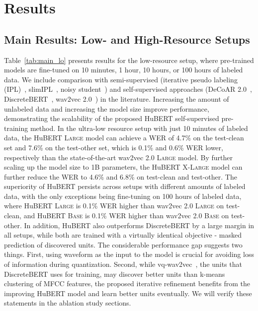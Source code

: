 \section{Results}
\subsection{Main Results: Low- and High-Resource Setups}

Table~\ref{tab:main_lo} presents results for the low-resource setup, where pre-trained models are fine-tuned on 10 minutes, 1 hour, 10 hours, or 100 hours of labeled data. We include comparison with semi-supervised (iterative pseudo labeling (IPL)~\cite{xu2020iterative}, slimIPL~\cite{likhomanenko2020slimipl}, noisy student~\cite{park2020improved}) and self-supervised approaches (DeCoAR 2.0~\cite{ling2020decoar}, DiscreteBERT~\cite{baevski2019effectiveness}, wav2vec 2.0~\cite{baevski2020wav2vec}) in the literature. Increasing the amount of unlabeled data and increasing the model size improve performance, demonstrating the scalability of the proposed HuBERT self-supervised pre-training method. In the ultra-low resource setup with just 10 minutes of labeled data, the HuBERT \textsc{Large} model can achieve a WER of 4.7\% on the test-clean set and 7.6\% on the test-other set, which is 0.1\% and 0.6\% WER lower, respectively than the state-of-the-art wav2vec 2.0 \textsc{Large} model. By further scaling up the model size to 1B parameters, the HuBERT \textsc{X-Large} model can further reduce the WER to 4.6\% and 6.8\% on test-clean and test-other. The superiority of HuBERT persists across setups with different amounts of labeled data, with the only exceptions being fine-tuning on 100 hours of labeled data, where HuBERT \textsc{Large} is 0.1\% WER higher than wav2vec 2.0 \textsc{Large} on test-clean, and HuBERT \textsc{Base} is 0.1\% WER higher than wav2vec 2.0 \textsc{Base} on test-other. In addition, HuBERT also outperforms DiscreteBERT by a large margin in all setups, while both are trained with a virtually identical objective - masked prediction of discovered units. The considerable performance gap suggests two things. First, using waveform as the input to the model is crucial for avoiding loss of information during quantization. Second, while vq-wav2vec~\cite{baevski2019vq}, the units that DiscreteBERT uses for training, may discover better units than k-means clustering of MFCC features, the proposed iterative refinement benefits from the improving HuBERT model and learn better units eventually. We will verify these statements in the ablation study sections.


